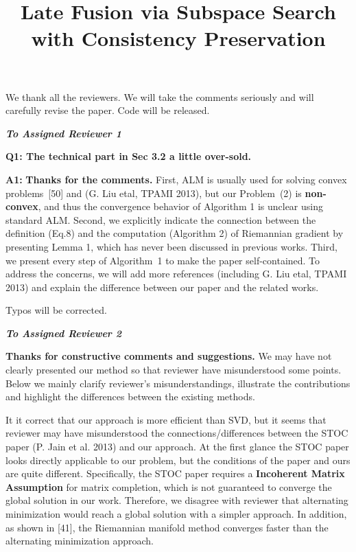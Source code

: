 \documentclass[10pt,twocolumn,letterpaper]{article}
\begin{document}
\title{Late Fusion via Subspace Search with Consistency Preservation}

\maketitle
\thispagestyle{empty}

We thank all the reviewers.
We will take the comments seriously and will carefully revise the paper.
Code will be released.

\noindent\emph{\textbf{To Assigned Reviewer 1}}

{\bf Q1: The technical part in Sec 3.2 a little over-sold.}

{\bf A1:}
\textbf{Thanks for the comments.}
First, ALM is usually used for solving convex problems~[50] and (G. Liu etal, TPAMI 2013),
but our Problem~(2) is \textbf{non-convex},
and thus the convergence behavior of Algorithm 1 is unclear using standard ALM.
Second, we explicitly indicate the connection between the definition (Eq.8) and the computation (Algorithm 2) of Riemannian gradient by presenting Lemma 1,
which has never been discussed in previous works.
Third, we present every step of Algorithm~1 to make the paper self-contained.
To address the concerns, we will add more references (including G. Liu etal, TPAMI 2013) and explain the difference between our paper and the related works.

Typos will be corrected.

\noindent\emph{\textbf{To Assigned Reviewer 2}}

\textbf{Thanks for constructive comments and suggestions.}
We may have not clearly presented our method so that reviewer have misunderstood some points.
Below we mainly clarify reviewer's misunderstandings, illustrate the contributions and highlight the differences between the existing methods.

It it correct that our approach is more efficient than SVD,
but it seems that reviewer may have misunderstood the connections/differences between the STOC paper (P. Jain et al. 2013) and our approach.
At the first glance the STOC paper looks directly applicable to our problem,
but the conditions of the paper and ours are quite different.
Specifically, the STOC paper requires a \textbf{Incoherent Matrix Assumption} for matrix completion,
which is not guaranteed to converge the global solution in our work.
Therefore, we disagree with reviewer that alternating minimization would reach a global solution with a simpler approach.
In addition, as shown in [41], the Riemannian manifold method converges faster than the alternating minimization approach.
\end{document}
